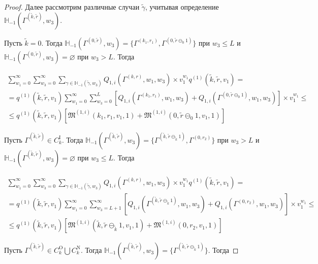 \documentclass{report}
\begin{document}
\begin{proof}
Далее рассмотрим различные случаи $\tilde{\gamma}$, учитывая определение ${\mathbb H}_{-1}(\Gamma^{(\tilde{k},\tilde{r})}, w_3) $.

Пусть $\tilde{k} = 0$. Тогда ${\mathbb H}_{-1}(\Gamma^{(0,\tilde{r})}, w_3) = \{\Gamma^{(k_1,r_1)}, \Gamma^{(0,\tilde{r}\ominus_0 1)}\}$ при $w_3\leqslant L$ и ${\mathbb H}_{-1}(\Gamma^{(0,\tilde{r})}, w_3) = \varnothing$ при $w_3 > L$. Тогда


\begin{multline*}
 \sum_{w_1=0}^{\infty}\sum_{w_3=0}^{\infty} \sum_{\gamma \in {\mathbb H}_{-1}(\tilde{\gamma},w_3)} Q_{1,i}(\Gamma^{(k,r)},w_1,w_3)  \times  v_1^{w_1} q^{(1)}(\tilde{k},\tilde{r},v_1) = \\ = q^{(1)}(\tilde{k},\tilde{r},v_1)  \sum_{w_1=0}^{\infty}\sum_{w_3=0}^{L} [ Q_{1,i}(\Gamma^{(k_1,r_1)},w_1,w_3) + Q_{1,i}(\Gamma^{(0,\tilde{r}\ominus_0 1)},w_1,w_3) ] \times  v_1^{w_1} \leqslant \\ \leqslant
 q^{(1)}(\tilde{k},\tilde{r},v_1)  [\mathfrak{M}^{(1,i)}(k_1,r_1,v_1,1)  + \mathfrak{M}^{(1,i)}(0,\tilde{r}\ominus_0 1,v_1,1) ]
\end{multline*}


Пусть $\Gamma^{(\tilde{k},\tilde{r})}\in C_k^{\mathrm{I}}$. Тогда ${\mathbb H}_{-1}(\Gamma^{(\tilde{k},\tilde{r})}, w_3) = \{\Gamma^{(\tilde{k},\tilde{r}\ominus_{\tilde{k}} 1)}, \Gamma^{(0,r_2)}\}$ при $w_3 >  L$ и ${\mathbb H}_{-1}(\Gamma^{(\tilde{k},\tilde{r})}, w_3) = \varnothing$ при $w_3 \leqslant L$. Тогда

\begin{multline*}
 \sum_{w_1=0}^{\infty}\sum_{w_3=0}^{\infty} \sum_{\gamma \in {\mathbb H}_{-1}(\tilde{\gamma},w_3)} Q_{1,i}(\Gamma^{(k,r)},w_1,w_3)  \times  v_1^{w_1} q^{(1)}(\tilde{k},\tilde{r},v_1) = \\ = q^{(1)}(\tilde{k},\tilde{r},v_1)  \sum_{w_1=0}^{\infty}\sum_{w_3=L+1}^{\infty} [ Q_{1,i}(\Gamma^{(\tilde{k},\tilde{r}\ominus_{\tilde{k}} 1)},w_1,w_3) + Q_{1,i}(\Gamma^{(0,r_2)},w_1,w_3) ] \times  v_1^{w_1} \leqslant \\ \leqslant
 q^{(1)}(\tilde{k},\tilde{r},v_1)  [\mathfrak{M}^{(1,i)}(\tilde{k},\tilde{r}\ominus_{\tilde{k}} 1,v_1,1)  + \mathfrak{M}^{(1,i)}(0,r_2,v_1,1) ]
\end{multline*}


Пусть $\Gamma^{(\tilde{k},\tilde{r})}\in C_k^{\mathrm{O}} \bigcup C_k^{\mathrm{N}}$. Тогда ${\mathbb H}_{-1}(\Gamma^{(\tilde{k},\tilde{r})}, w_3) = \{\Gamma^{(\tilde{k},\tilde{r}\ominus_{\tilde{k}} 1)}\}$. Тогда


\end{proof}
\end{document}
